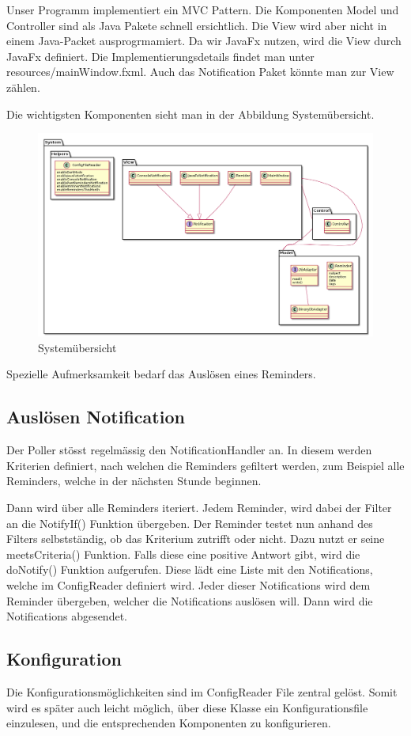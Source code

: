 Unser Programm implementiert ein MVC Pattern. Die Komponenten Model und Controller sind als Java Pakete schnell ersichtlich. Die View wird aber nicht in einem Java-Packet ausprogrmamiert. Da wir JavaFx nutzen, wird die View durch JavaFx definiert. Die Implementierungsdetails findet man unter resources/mainWindow.fxml. Auch das Notification Paket könnte man zur View zählen.

Die wichtigsten Komponenten sieht man in der Abbildung Systemübersicht.
\begin{landscape}
\begin{figure}
  \centering
    \includegraphics[width=1\textwidth]{../uml/uebersicht01.png}
  \caption{Systemübersicht}
  \label{fig:overview}
\end{figure}
\end{landscape}

Spezielle Aufmerksamkeit bedarf das Auslösen eines Reminders.
\subsection{Auslösen Notification}

Der Poller stösst regelmässig den NotificationHandler an.
In diesem werden Kriterien definiert, nach welchen die Reminders gefiltert werden, zum Beispiel alle Reminders, welche in der nächsten Stunde beginnen.



Dann wird über alle Reminders iteriert. Jedem Reminder, wird dabei der Filter an die NotifyIf() Funktion übergeben.
Der Reminder testet nun anhand des Filters selbstständig, ob das Kriterium zutrifft oder nicht. Dazu nutzt er seine meetsCriteria() Funktion.
Falls diese eine positive Antwort gibt, wird die doNotify() Funktion aufgerufen. Diese lädt eine Liste mit den Notifications, welche im ConfigReader definiert wird.
Jeder dieser Notifications wird dem Reminder übergeben, welcher die Notifications auslösen will. Dann wird die Notifications abgesendet.

\subsection{Konfiguration}
Die Konfigurationsmöglichkeiten sind im ConfigReader File zentral gelöst. Somit wird es später auch leicht möglich, über diese Klasse ein Konfigurationsfile
einzulesen, und die entsprechenden Komponenten zu konfigurieren.
